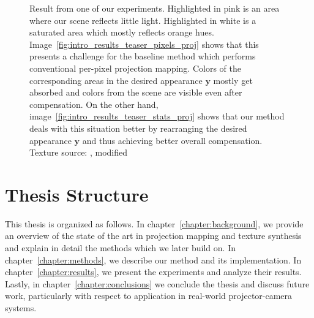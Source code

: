 \begin{figure}[ht]
\begin{subfigure}{\textwidth}
    \end{subfigure}
    \caption{Result from one of our experiments. Highlighted in pink is an area where our scene reflects little light. Highlighted in white is a saturated area which mostly reflects orange hues. Image~\ref{fig:intro_results_teaser_pixels_proj} shows that this presents a challenge for the baseline method which performs conventional per-pixel projection mapping. Colors of the corresponding areas in the desired appearance \(\bm{y}\) mostly get absorbed and colors from the scene are visible even after compensation. On the other hand, image~\ref{fig:intro_results_teaser_stats_proj} shows that our method deals with this situation better by rearranging the desired appearance \(\bm{y}\) and thus achieving better overall compensation. Texture source: \citet{Pixar128}, modified}
    \label{fig:intro_result_teaser}
\end{figure}

\section{Thesis Structure}
\label{section:intro-thesis_structure}

This thesis is organized as follows. In chapter~\ref{chapter:background}, we provide an overview of the state of the art in projection mapping and texture synthesis and explain in detail the methods which we later build on. In chapter~\ref{chapter:methods}, we describe our method and its implementation. In chapter~\ref{chapter:results}, we present the experiments and analyze their results. Lastly, in chapter~\ref{chapter:conclusions} we conclude the thesis and discuss future work, particularly with respect to application in real-world projector-camera systems.
